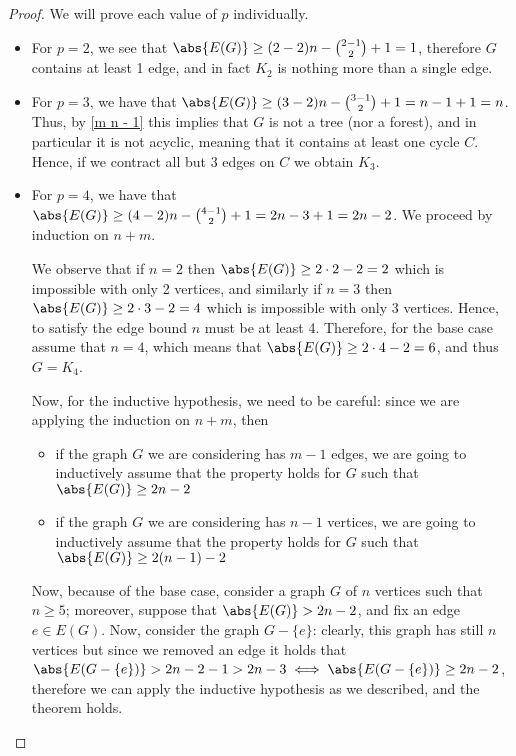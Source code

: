 \documentclass[a4paper, 12pt]{report}
\begin{document}
    \begin{proof}
        We will prove each value of $p$ individually.

        \begin{itemize}
            \item For $p = 2$, we see that $\abs{E(G)} \ge (2 - 2)n - \binom{2 - 1}{2} + 1 = 1$, therefore $G$ contains at least 1 edge, and in fact $K_2$ is nothing more than a single edge.
            \item For $p = 3$, we have that $\abs{E(G)} \ge (3 - 2) n - \binom{3 - 1}{2} + 1 = n - 1 + 1 = n$. Thus, by \cref{m n - 1} this implies that $G$ is not a tree (nor a forest), and in particular it is not acyclic, meaning that it contains at least one cycle $C$. Hence, if we contract all but 3 edges on $C$ we obtain $K_3$.
            \item For $p = 4$, we have that $\abs{E(G)} \ge (4 - 2)n - \binom{4 - 1}{2} + 1 = 2n - 3 + 1 = 2n - 2$. We proceed by induction on $n + m$.

                We observe that if $n = 2$ then $\abs{E(G)} \ge 2 \cdot 2 - 2 = 2$ which is impossible with only 2 vertices, and similarly if $n = 3$ then $\abs{E(G)} \ge 2 \cdot 3 - 2 = 4$ which is impossible with only 3 vertices. Hence, to satisfy the edge bound $n$ must be at least 4. Therefore, for the base case assume that $n = 4$, which means that $\abs{E(G)} \ge 2 \cdot 4 - 2 = 6$, and thus $G = K_4$.

                Now, for the inductive hypothesis, we need to be careful: since we are applying the induction on $n + m$, then

                \begin{itemize}
                    \item if the graph $G$ we are considering has $m - 1$ edges, we are going to inductively assume that the property holds for $G$ such that $\abs{E(G)} \ge 2n - 2$
                    \item if the graph $G$ we are considering has $n - 1$ vertices, we are going to inductively assume that the property holds for $G$ such that $\abs{E(G)} \ge 2 (n - 1) - 2$
                \end{itemize}

                Now, because of the base case, consider a graph $G$ of $n$ vertices such that $n \ge 5$; moreover, suppose that $\abs{E(G)} > 2n - 2$, and fix an edge $e \in E(G)$. Now, consider the graph $G - \{e\}$: clearly, this graph has still $n$ vertices but since we removed an edge it holds that $\abs{E(G - \{e\})} > 2n - 2 - 1 > 2n - 3 \iff \abs{E(G - \{e\})} \ge 2n - 2$, therefore we can apply the inductive hypothesis as we described, and the theorem holds.


\end{itemize}
\end{proof}
\end{document}
